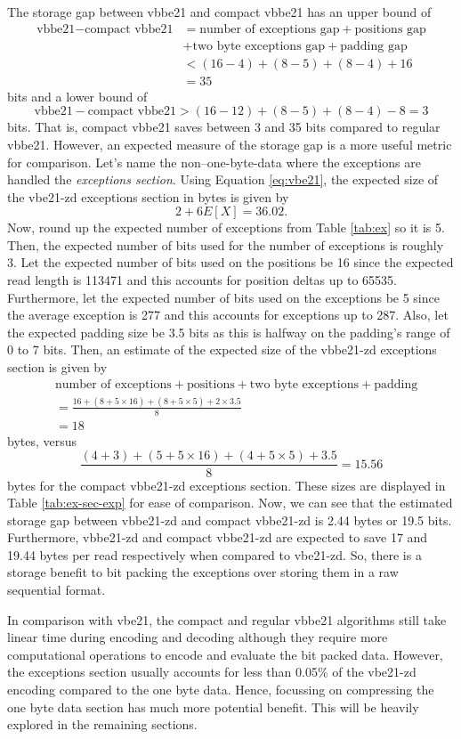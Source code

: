 The storage gap between vbbe21 and compact vbbe21 has an upper bound of
\begin{align*}
	\text{vbbe21} - \text{compact vbbe21} &= \text{number of exceptions gap}
	+ \text{positions gap}\\ &+\text{two byte exceptions gap} + \text{padding gap}\\
	&< (16-4) + (8-5) + (8-4) + 16\\
	&= 35
\end{align*}
bits
and a lower bound of
\[ \text{vbbe21} - \text{compact vbbe21} > (16-12) + (8-5) + (8-4) - 8 = 3 \]
bits.
That is, compact vbbe21 saves between 3 and 35 bits compared to regular vbbe21.
However, an expected measure of the storage gap is a more useful metric for
comparison. Let's name the non--one-byte-data where the exceptions are handled
the \textit{exceptions section}. Using Equation \ref{eq:vbe21}, the expected size of
the vbe21-zd exceptions section in bytes is given by
\[ 2 + 6E[X] = 36.02. \]
Now, round up the expected number of exceptions from Table \ref{tab:ex} so it is
5. Then, the expected number of bits used for the number of exceptions is roughly
3. Let the expected number of bits used on the positions be 16 since the expected
read length is \num{113471} and this accounts for position deltas up to
\num{65535}. Furthermore, let the expected number of bits used on the
exceptions be 5 since the average exception is 277 and this accounts for
exceptions up to 287. Also, let the expected padding size be 3.5 bits as this is
halfway on the padding's range of 0 to 7 bits.
Then, an estimate of the expected size of the vbbe21-zd exceptions section is
given by
\begin{align*}
	&\text{number of exceptions} + \text{positions} + \text{two byte exceptions} + \text{padding}\\
	&= \frac{16 + (8+5\times16) + (8+5\times 5) + 2\times3.5}{8}\\
	&= 18
\end{align*}
bytes, versus
\[ \frac{(4+3) + (5+5\times16) + (4+5\times 5) + 3.5}{8}= 15.56 \]
bytes
for the compact vbbe21-zd exceptions section. These sizes are displayed in Table
\ref{tab:ex-sec-exp}
for ease of comparison. Now, we can see that the estimated storage gap between
vbbe21-zd and compact vbbe21-zd is 2.44 bytes or 19.5 bits. Furthermore,
vbbe21-zd and compact vbbe21-zd are expected to save 17 and 19.44 bytes
per read respectively when compared to vbe21-zd. So, there is a storage benefit
to bit packing the exceptions over storing them in a raw sequential format.




In comparison with vbe21, the compact and regular vbbe21 algorithms still take
linear time during encoding and decoding although they require more computational
operations to encode and evaluate the bit packed data. However, the exceptions
section usually accounts for less than 0.05\% of the vbe21-zd encoding
compared to the one byte data. Hence, focussing
on compressing the one byte data section has much more potential benefit. This
will be heavily explored in the remaining sections.

